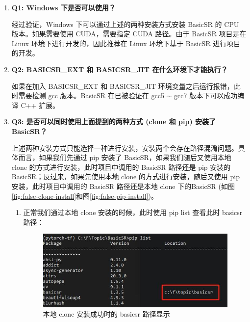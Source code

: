 \documentclass[../main.tex]{subfiles}
\begin{document}
\begin{enumerate}
    \item \textbf{Q1: Windows 下是否可以使用？}

    经过验证，Windows 下可以通过上述的两种安装方式安装 BasicSR 的 CPU 版本。如果需要使用 CUDA，需要指定 CUDA 路径。由于 BasicSR 项目是在 Linux 环境下进行开发的，因此推荐在 Linux 环境下基于 BasicSR 进行项目的开发。

    \item \textbf{Q2: BASICSR\_EXT 和 BASICSR\_JIT 在什么环境下才能执行？}

    如果在加入 BASICSR\_EXT 和 BASICSR\_JIT 环境变量之后运行报错，此时需要检测 gcc 版本。BasicSR 在已被验证在 gcc5 $\sim$ gcc7 版本下可以成功编译 C++ 扩展。

    \item \textbf{Q3: 是否可以同时使用上面提到的两种方式 (clone 和 pip) 安装了 BasicSR？}

    上述两种安装方式只能选择一种进行安装，安装两个会存在路径混淆问题。具体而言，如果我们先通过 pip 安装了 BasicSR，如果我们随后又使用本地 clone 的方式进行安装，此时项目中调用的 BasicSR 路径还是 pip 安装的 BasicSR；反过来，如果先使用本地 clone 的方式进行安装，随后又使用 pip 安装，此时项目中调用的 BasicSR 路径还是本地 clone 下的BasicSR (如图\ref{fig:false-clone-install}和图\ref{fig:false-pip-install})。

\begin{enumerate}
    \item 正常我们通过本地 clone 安装的时候，此时使用 pip list 查看此时 basicsr 路径：
    \begin{figure}[H]
	\begin{center}
		\includegraphics[width=0.5\linewidth]{figures/installation_clone_install_location.jpg}
		\caption{本地 clone 安装成功时的 basicsr 路径显示}
		\label{fig:correct-clone-install}
	\end{center}
	\vspace{-0.5cm}
    \end{figure}


\end{enumerate}
\end{enumerate}
\end{document}
